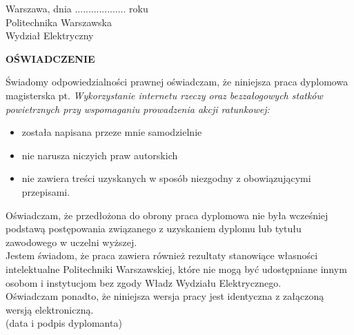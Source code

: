 \newpage
\hfill \hfill Warszawa, dnia ................... roku \\
Politechnika Warszawska\\
Wydział Elektryczny
\vskip 1cm
\begin{center}
 {\large\bf  OŚWIADCZENIE} \\
\end{center}
\vskip 1cm
Świadomy odpowiedzialności prawnej oświadczam, że niniejsza praca dyplomowa magisterska pt. 
\textit{Wykorzystanie internetu rzeczy oraz bezzałogowych statków powietrznych przy wspomaganiu prowadzenia akcji ratunkowej:}
\begin{itemize}
\item została napisana przeze mnie samodzielnie
\item nie narusza niczyich praw autorskich 
\item nie zawiera treści uzyskanych w sposób niezgodny z obowiązującymi przepisami.
\end{itemize}
Oświadczam, że przedłożona do obrony praca dyplomowa nie była wcześniej podstawą postępowania związanego z uzyskaniem dyplomu lub tytułu zawodowego w uczelni wyższej. \\
Jestem świadom, że praca zawiera również rezultaty stanowiące własności intelektualne Politechniki Warszawskiej, które nie mogą być udostępniane innym osobom i instytucjom bez zgody Władz Wydziału Elektrycznego. \\
Oświadczam ponadto, że niniejsza wersja pracy jest identyczna z załączoną wersją elektroniczną. \\

\vskip 1cm
\noindent
\hfill \hfill (data i podpis dyplomanta)
